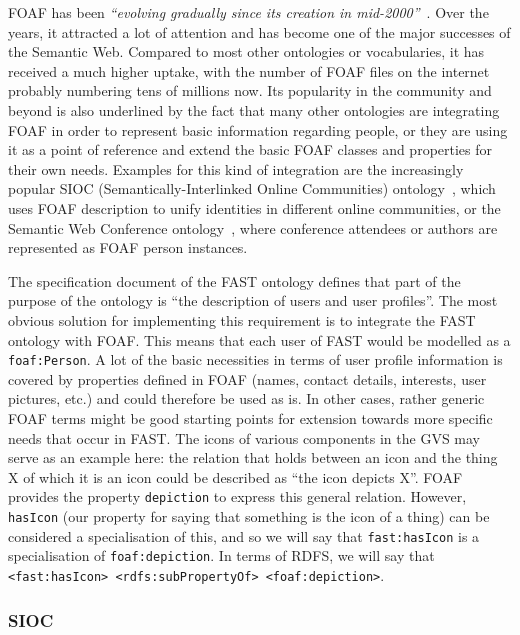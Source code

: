 \documentclass{fast_latex}
\begin{document}
FOAF has been \emph{``evolving gradually since its creation in mid-2000''}~\cite{brickley2004foaf}. Over the years, it attracted a lot of attention and has become one of the major successes of the Semantic Web. Compared to most other ontologies or vocabularies, it has received a much higher uptake, with the number of FOAF files on the internet probably numbering tens of millions now. Its popularity in the community and beyond is also underlined by the fact that many other ontologies are integrating FOAF in order to represent basic information regarding people, or they are using it as a point of reference and extend the basic FOAF classes and properties for their own needs. Examples for this kind of integration are the increasingly popular SIOC (Semantically-Interlinked Online Communities) ontology~\cite{breslin2005communitiesEswc}, which uses FOAF description to unify identities in different online communities, or the Semantic Web Conference ontology~\cite{moeller2007dogfood}, where conference attendees or authors are represented as FOAF person instances.

The specification document of the FAST ontology defines that part of the purpose of the ontology is ``the description of users and user profiles''. The most obvious solution for implementing this requirement is to integrate the FAST ontology with FOAF. This means that each user of FAST would be modelled as a \texttt{foaf:Person}. A lot of the basic necessities in terms of user profile information is covered by properties defined in FOAF (names, contact details, interests, user pictures, etc.) and could therefore be used as is. In other cases, rather generic FOAF terms might be good starting points for extension towards more specific needs that occur in FAST. The icons of various components in the GVS may serve as an example here: the relation that holds between an icon and the thing X of which it is an icon could be described as ``the icon depicts X''. FOAF provides the property \texttt{depiction} to express this general relation. However, \texttt{hasIcon} (our property for saying that something is the icon of a thing) can be considered a specialisation of this, and so we will say that \texttt{fast:hasIcon} is a specialisation of \texttt{foaf:depiction}. In terms of RDFS, we will say that \texttt{<fast:hasIcon> <rdfs:subPropertyOf> <foaf:depiction>}.

\subsubsection{SIOC} %
\label{ssub:sioc}
\end{document}
